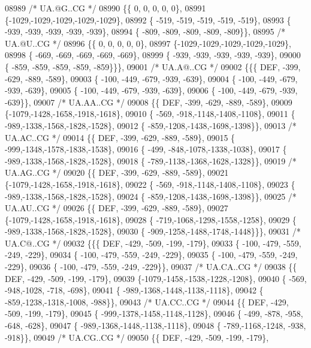 \begin{DoxyCode}
08989 \textcolor{comment}{/* UA.@G..CG */}
08990 \{\{    0,    0,    0,    0,    0\},
08991 \{-1029,-1029,-1029,-1029,-1029\},
08992 \{ -519, -519, -519, -519, -519\},
08993 \{ -939, -939, -939, -939, -939\},
08994 \{ -809, -809, -809, -809, -809\}\},
08995 \textcolor{comment}{/* UA.@U..CG */}
08996 \{\{    0,    0,    0,    0,    0\},
08997 \{-1029,-1029,-1029,-1029,-1029\},
08998 \{ -669, -669, -669, -669, -669\},
08999 \{ -939, -939, -939, -939, -939\},
09000 \{ -859, -859, -859, -859, -859\}\}\},
09001 \textcolor{comment}{/* UA.A@..CG */}
09002 \{\{\{  DEF, -399, -629, -889, -589\},
09003 \{ -100, -449, -679, -939, -639\},
09004 \{ -100, -449, -679, -939, -639\},
09005 \{ -100, -449, -679, -939, -639\},
09006 \{ -100, -449, -679, -939, -639\}\},
09007 \textcolor{comment}{/* UA.AA..CG */}
09008 \{\{  DEF, -399, -629, -889, -589\},
09009 \{-1079,-1428,-1658,-1918,-1618\},
09010 \{ -569, -918,-1148,-1408,-1108\},
09011 \{ -989,-1338,-1568,-1828,-1528\},
09012 \{ -859,-1208,-1438,-1698,-1398\}\},
09013 \textcolor{comment}{/* UA.AC..CG */}
09014 \{\{  DEF, -399, -629, -889, -589\},
09015 \{ -999,-1348,-1578,-1838,-1538\},
09016 \{ -499, -848,-1078,-1338,-1038\},
09017 \{ -989,-1338,-1568,-1828,-1528\},
09018 \{ -789,-1138,-1368,-1628,-1328\}\},
09019 \textcolor{comment}{/* UA.AG..CG */}
09020 \{\{  DEF, -399, -629, -889, -589\},
09021 \{-1079,-1428,-1658,-1918,-1618\},
09022 \{ -569, -918,-1148,-1408,-1108\},
09023 \{ -989,-1338,-1568,-1828,-1528\},
09024 \{ -859,-1208,-1438,-1698,-1398\}\},
09025 \textcolor{comment}{/* UA.AU..CG */}
09026 \{\{  DEF, -399, -629, -889, -589\},
09027 \{-1079,-1428,-1658,-1918,-1618\},
09028 \{ -719,-1068,-1298,-1558,-1258\},
09029 \{ -989,-1338,-1568,-1828,-1528\},
09030 \{ -909,-1258,-1488,-1748,-1448\}\}\},
09031 \textcolor{comment}{/* UA.C@..CG */}
09032 \{\{\{  DEF, -429, -509, -199, -179\},
09033 \{ -100, -479, -559, -249, -229\},
09034 \{ -100, -479, -559, -249, -229\},
09035 \{ -100, -479, -559, -249, -229\},
09036 \{ -100, -479, -559, -249, -229\}\},
09037 \textcolor{comment}{/* UA.CA..CG */}
09038 \{\{  DEF, -429, -509, -199, -179\},
09039 \{-1079,-1458,-1538,-1228,-1208\},
09040 \{ -569, -948,-1028, -718, -698\},
09041 \{ -989,-1368,-1448,-1138,-1118\},
09042 \{ -859,-1238,-1318,-1008, -988\}\},
09043 \textcolor{comment}{/* UA.CC..CG */}
09044 \{\{  DEF, -429, -509, -199, -179\},
09045 \{ -999,-1378,-1458,-1148,-1128\},
09046 \{ -499, -878, -958, -648, -628\},
09047 \{ -989,-1368,-1448,-1138,-1118\},
09048 \{ -789,-1168,-1248, -938, -918\}\},
09049 \textcolor{comment}{/* UA.CG..CG */}
09050 \{\{  DEF, -429, -509, -199, -179\},

\end{DoxyCode}
